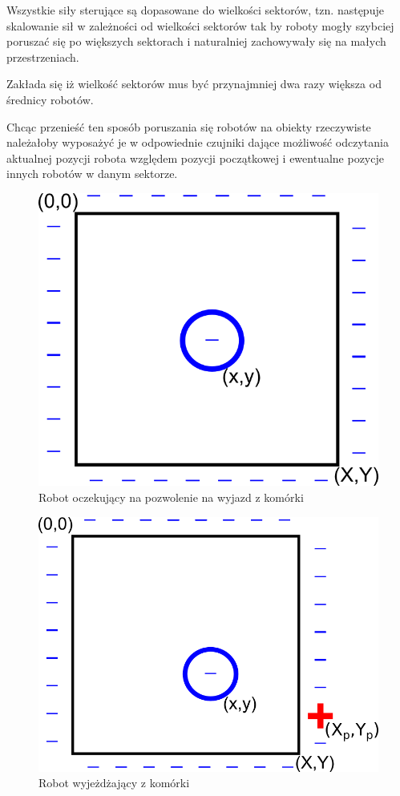 	Wszystkie siły sterujące są dopasowane do wielkości sektorów, tzn. następuje skalowanie sił w zależności od wielkości sektorów tak by roboty mogły szybciej poruszać się po większych sektorach i naturalniej zachowywały się na małych przestrzeniach.
	
	Zakłada się iż wielkość sektorów mus być przynajmniej dwa razy większa od średnicy robotów.
	
	Chcąc przenieść ten sposób poruszania się robotów na obiekty rzeczywiste należałoby wyposażyć je w odpowiednie czujniki dające możliwość odczytania aktualnej pozycji robota względem pozycji początkowej i ewentualne pozycje innych robotów w danym sektorze.
	
	
	\begin{figure}[H]
		\centering
		\includegraphics[scale=0.9]{img/waiting.png}
		\caption{Robot oczekujący na pozwolenie na wyjazd z komórki}
		\label{pic:waiting}
	\end{figure}
	\begin{figure}[H]
		\centering
		\includegraphics[scale=0.9]{img/moving.png}
		\caption{Robot wyjeżdżający z komórki}
		\label{pic:moving}
	\end{figure}
